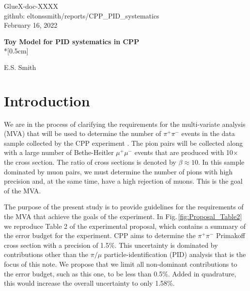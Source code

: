 \documentclass[12pt]{article}
\begin{document}
\begin{flushright}
GlueX-doc-XXXX\\
github: eltonssmith/reports/CPP\_PID\_systematics\\
February 16, 2022
\end{flushright}




\begin{center}
{\Large \bf Toy Model for PID systematics in CPP}\\*[0.5cm]
\end{center}

\begin{center}   
{\sc  E.S. Smith}\\  
\end{center}


\section{Introduction}
We are in the process of clarifying the requirements for the multi-variate analysis (MVA) that will be used to determine the number
of $\pi^+\pi^-$ events in the data sample collected by the CPP experiment \cite{CPPexp}.  The pion pairs will be collected along with 
a large number of Bethe-Heitler $\mu^+\mu^-$ events that are produced with 10$\times$ the cross section. The ratio of cross sections is 
denoted by $\beta\approx 10$. In this sample dominated by muon pairs, we must determine the number of pions with high precision
and, at the same time, have a high rejection of muons. This is the goal of the MVA. 

The purpose of the present study is to provide guidelines for the requirements of the MVA that achieve the goals of the experiment. In Fig.\,\ref{fig:Proposal_Table2} 
we reproduce Table 2 of the experimental proposal, which contains a summary of the error budget for the experiment. CPP aims to determine
the $\pi^+\pi^-$ Primakoff cross section with a precision of 1.5\%. This uncertainty is dominated by contributions other than the $\pi/\mu$ 
particle-identification (PID) analysis that is the focus of this note. We propose that we limit all non-dominant contributions to the error budget,
such as this one, to be less than 0.5\%. Added in quadrature, this would increase the overall uncertainty to only 1.58\%. 
\end{document}
